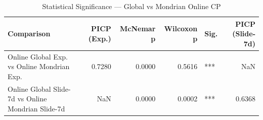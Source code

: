 \begin{table}
\caption{Statistical Significance — Global vs Mondrian Online CP}
\label{tab:t5c_3_significance}
\begin{tabular}{lrrrlr}
\toprule
Comparison & PICP (Exp.) & McNemar p & Wilcoxon p & Sig. & PICP (Slide-7d) \\
\midrule
Online Global Exp. vs Online Mondrian Exp. & 0.7280 & 0.0000 & 0.5616 & *** & NaN \\
Online Global Slide-7d vs Online Mondrian Slide-7d & NaN & 0.0000 & 0.0002 & *** & 0.6368 \\
\bottomrule
\end{tabular}
\end{table}
